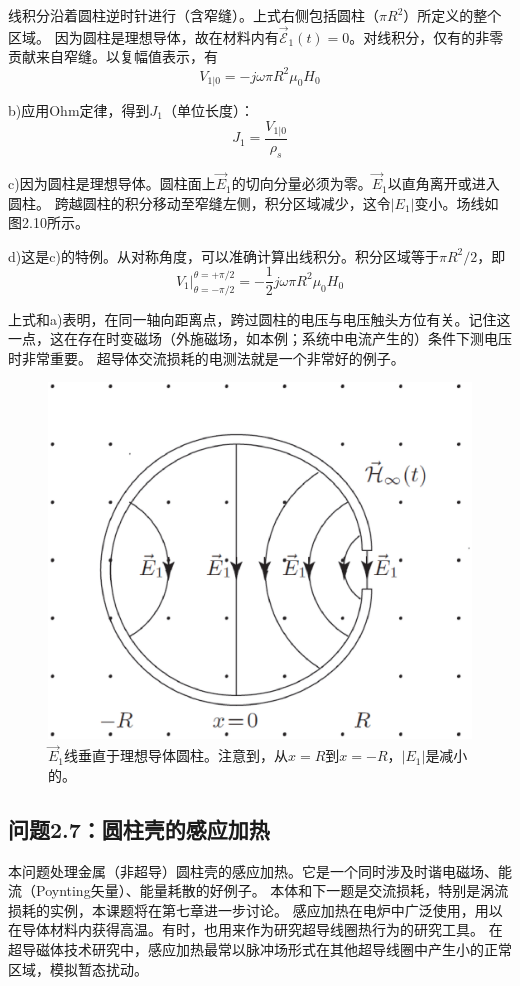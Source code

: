 线积分沿着圆柱逆时针进行（含窄缝）。上式右侧包括圆柱（$\pi R^2$）所定义的整个区域。
因为圆柱是理想导体，故在材料内有$\vec{\mathcal{E}}_1(t)=0$。对线积分，仅有的非零贡献来自窄缝。以复幅值表示，有
$$V_{1|0}=-j\omega \pi R^2 \mu_0 H_0$$

b)应用Ohm定律，得到$J_1$（单位长度）：
$$J_1=\frac{V_{1|0}}{\rho_s}$$

c)因为圆柱是理想导体。圆柱面上$\vec{E}_1$的切向分量必须为零。$\vec{E}_1$以直角离开或进入圆柱。
跨越圆柱的积分移动至窄缝左侧，积分区域减少，这令$|E_1|$变小。场线如图2.10所示。

d)这是c)的特例。从对称角度，可以准确计算出线积分。积分区域等于$\pi R^2/2$，即
$$V_1 |_{\theta=-\pi/2}^{\theta=+\pi/2}=-\frac{1}{2}j\omega \pi R^2 \mu_0 H_0$$

上式和a)表明，在同一轴向距离点，跨过圆柱的电压与电压触头方位有关。记住这一点，这在存在时变磁场（外施磁场，如本例；系统中电流产生的）条件下测电压时非常重要。
超导体交流损耗的电测法就是一个非常好的例子。

\begin{figure}
  \centering
 \includegraphics[scale=0.4]{chpt2/figs/fig2.10.eps}
  \caption{$\vec{E}_1$线垂直于理想导体圆柱。注意到，从$x=R$到$x=-R$，$|E_1|$是减小的。}
\end{figure}


\subsection{问题2.7：圆柱壳的感应加热}
本问题处理金属（非超导）圆柱壳的感应加热。它是一个同时涉及时谐电磁场、能流（Poynting矢量）、能量耗散的好例子。
本体和下一题是交流损耗，特别是涡流损耗的实例，本课题将在第七章进一步讨论。
感应加热在电炉中广泛使用，用以在导体材料内获得高温。有时，也用来作为研究超导线圈热行为的研究工具。
在超导磁体技术研究中，感应加热最常以脉冲场形式在其他超导线圈中产生小的正常区域，模拟暂态扰动。

